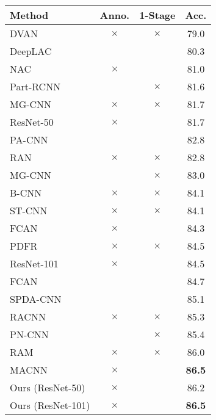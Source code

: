 \documentclass[runningheads]{llncs}
\begin{document}
\begin{table}[p]
\begin{minipage}[p]{0.48\linewidth}
    \centering
    \begin{subtable}[t]{\textwidth}
    \begin{tabular}[t]{lccc}
      \toprule
      Method & Anno. & 1-Stage & Acc.\\
      \midrule
	DVAN \cite{zhao2016diversified} & $\times$ & $\times$ & 79.0\\
	DeepLAC \cite{lin2015deep} & \checkmark & \checkmark & 80.3\\
	NAC \cite{simon2015neural} & $\times$ & \checkmark & 81.0\\
	Part-RCNN \cite{zhang2014part} & \checkmark & $\times$ & 81.6\\
	MG-CNN \cite{wang2015multiple} & $\times$ & $\times$ & 81.7\\
	ResNet-50 \cite{he2016deep} & $\times$ & \checkmark & 81.7\\
	PA-CNN \cite{krause2015fine} & \checkmark & \checkmark & 82.8\\
	RAN \cite{wang2017residual} & $\times$ & $\times$ & 82.8\\
	MG-CNN \cite{wang2015multiple} & \checkmark & $\times$ & 83.0\\
	B-CNN \cite{lin2015bilinear} & $\times$ & $\times$ & 84.1\\
	ST-CNN \cite{jaderberg2015spatial} & $\times$ & $\times$ & 84.1\\
	FCAN \cite{liu2016fully} & $\times$ & \checkmark & 84.3\\
	PDFR \cite{zhang2016picking} & $\times$ & $\times$ & 84.5\\
	ResNet-101 \cite{he2016deep} & $\times$ & \checkmark & 84.5\\
	FCAN \cite{liu2016fully} & \checkmark & \checkmark & 84.7\\
	SPDA-CNN \cite{zhang2016spda} & \checkmark & \checkmark & 85.1\\
	RACNN \cite{fu2017look} & $\times$ & $\times$ & 85.3\\
	PN-CNN \cite{branson2014bird} & \checkmark & $\times$ & 85.4\\
	RAM \cite{li2017dynamic} & $\times$ & $\times$ & 86.0\\
	MACNN \cite{zheng2017learning} & $\times$ & \checkmark & \bf86.5\\
	\midrule
        	Ours (ResNet-50) & $\times$ & \checkmark & 86.2\\
	Ours (ResNet-101) & $\times$ & \checkmark & \bf86.5\\
        \bottomrule
      \end{tabular}

\end{subtable}
\end{minipage}
\end{table}
\end{document}
